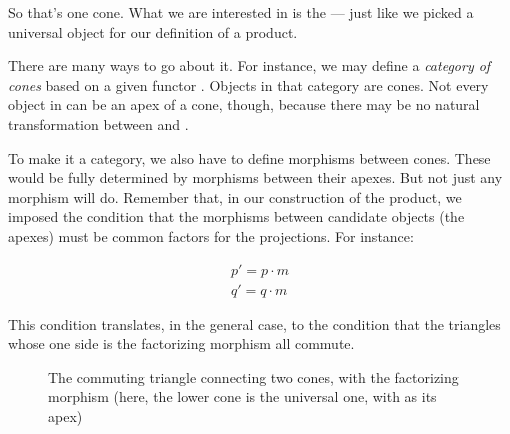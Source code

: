 \noindent
So that's one cone. What we are interested in is the  --- just like we picked a universal object for our definition of a
product.

There are many ways to go about it. For instance, we may define a
\emph{category of cones} based on a given functor . Objects in that
category are cones. Not every object  in  can be an
apex of a cone, though, because there may be no natural transformation
between  and .

To make it a category, we also have to define morphisms between cones.
These would be fully determined by morphisms between their apexes. But
not just any morphism will do. Remember that, in our construction of the
product, we imposed the condition that the morphisms between candidate
objects (the apexes) must be common factors for the projections. For
instance:

\begin{equation*}
\begin{split}
p' = p \cdot m \\
q' = q \cdot m
\end{split}
\end{equation*}

\begin{figure}[H]
    \centering
\end{figure}

This condition translates, in the general case, to the condition that
the triangles whose one side is the factorizing morphism all commute.

\begin{figure}[H]
\centering
{}
\caption{The commuting triangle connecting two cones, with the factorizing
morphism  (here, the lower cone is the universal one, with
 as its apex)}
\end{figure}

